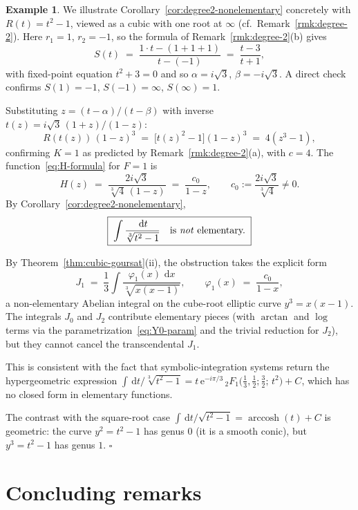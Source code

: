 \documentclass[11pt,a4paper]{article}
\theoremstyle{plain}
\theoremstyle{definition}
\newtheorem{example}[theorem]{Example}
\theoremstyle{remark}
\renewcommand{\d}{\,\mathrm{d}}
\begin{document}
\begin{example}
We illustrate Corollary~\ref{cor:degree2-nonelementary} concretely with $R(t) = t^2 - 1$, viewed as a cubic with one root at $\infty$ (cf.\ Remark~\ref{rmk:degree-2}). Here $r_1 = 1$, $r_2 = -1$, so the formula of Remark~\ref{rmk:degree-2}(b) gives
\[
  S(t) \;=\; \frac{1\cdot t - (1 + 1 + 1)}{t - (-1)} \;=\; \frac{t-3}{t+1},
\]
with fixed-point equation $t^2 + 3 = 0$ and so $\alpha = i\sqrt{3}$, $\beta = -i\sqrt{3}$. A direct check confirms $S(1) = -1$, $S(-1) = \infty$, $S(\infty) = 1$.

Substituting $z = (t-\alpha)/(t-\beta)$ with inverse $t(z) = i\sqrt{3}\,(1+z)/(1-z)$:
\[
  R(t(z))\,(1-z)^3 \;=\; \bigl[t(z)^2 - 1\bigr](1-z)^3 \;=\; 4(z^3 - 1),
\]
confirming $K = 1$ as predicted by Remark~\ref{rmk:degree-2}(a), with $c = 4$. The function~\eqref{eq:H-formula} for $F = 1$ is
\[
  H(z) \;=\; \frac{2i\sqrt{3}}{\sqrt[3]{4}\,(1-z)} \;=\; \frac{c_0}{1-z},\qquad c_0 := \frac{2i\sqrt{3}}{\sqrt[3]{4}}\neq 0.
\]
By Corollary~\ref{cor:degree2-nonelementary},
\[
  \boxed{\;\int \frac{\d t}{\sqrt[3]{t^2-1}} \quad\text{is \emph{not} elementary.}\;}
\]

By Theorem~\ref{thm:cubic-goursat}(ii), the obstruction takes the explicit form
\[
  J_1 \;=\; \frac{1}{3}\int \frac{\varphi_1(x)\,\d x}{\sqrt[3]{x(x-1)}},\qquad \varphi_1(x) \;=\; \frac{c_0}{1-x},
\]
a non-elementary Abelian integral on the cube-root elliptic curve $y^3 = x(x-1)$. The integrals $J_0$ and $J_2$ contribute elementary pieces (with $\arctan$ and $\log$ terms via the parametrization~\eqref{eq:Y0-param} and the trivial reduction for $J_2$), but they cannot cancel the transcendental $J_1$.

This is consistent with the fact that symbolic-integration systems return the hypergeometric expression $\int\d t/\sqrt[3]{t^2-1} = t\,\mathrm{e}^{-i\pi/3}\,{}_2F_1\bigl(\tfrac{1}{3},\tfrac{1}{2};\tfrac{3}{2};\, t^2\bigr) + C$, which has no closed form in elementary functions.

The contrast with the square-root case $\int\d t/\sqrt{t^2-1} = \operatorname{arccosh}(t) + C$ is geometric: the curve $y^2 = t^2-1$ has genus $0$ (it is a smooth conic), but $y^3 = t^2-1$ has genus $1$. \hfill$\square$
\end{example}

\section{Concluding remarks}
\label{sec:remarks}
\end{document}
